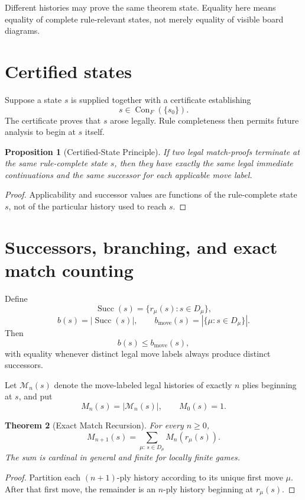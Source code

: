 \documentclass[11pt]{article}
\newtheorem{theorem}{Theorem}[section]
\newtheorem{proposition}[theorem]{Proposition}
\theoremstyle{definition}
\theoremstyle{remark}
\newcommand{\Conseq}{\operatorname{Con}}
\newcommand{\Succ}{\operatorname{Succ}}
\begin{document}
Different histories may prove the same theorem state.  Equality here means equality of complete rule-relevant states, not merely equality of visible board diagrams.

\section{Certified states}

Suppose a state $s$ is supplied together with a certificate establishing
\[
s\in\Conseq_F(\{s_0\}).
\]
The certificate proves that $s$ arose legally.  Rule completeness then permits future analysis to begin at $s$ itself.

\begin{proposition}[Certified-State Principle]
If two legal match-proofs terminate at the same rule-complete state $s$, then they have exactly the same legal immediate continuations and the same successor for each applicable move label.
\end{proposition}

\begin{proof}
Applicability and successor values are functions of the rule-complete state $s$, not of the particular history used to reach $s$.
\end{proof}

\section{Successors, branching, and exact match counting}

Define
\[
\Succ(s)=\{r_\mu(s):s\in D_\mu\},
\]
\[
b(s)=|\Succ(s)|,
\qquad
b_{\mathrm{move}}(s)=|\{\mu:s\in D_\mu\}|.
\]
Then
\[
b(s)\le b_{\mathrm{move}}(s),
\]
with equality whenever distinct legal move labels always produce distinct successors.

Let $\mathcal M_n(s)$ denote the move-labeled legal histories of exactly $n$ plies beginning at $s$, and put
\[
M_n(s)=|\mathcal M_n(s)|,
\qquad M_0(s)=1.
\]

\begin{theorem}[Exact Match Recursion]
For every $n\ge0$,
\[
\boxed{
M_{n+1}(s)=\sum_{\mu:\,s\in D_\mu} M_n(r_\mu(s)).
}
\]
The sum is cardinal in general and finite for locally finite games.
\end{theorem}

\begin{proof}
Partition each $(n+1)$-ply history according to its unique first move $\mu$.  After that first move, the remainder is an $n$-ply history beginning at $r_\mu(s)$.
\end{proof}
\end{document}
